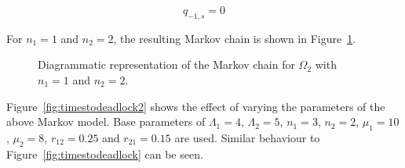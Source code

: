 \documentclass{article}
\numberwithin{equation}{section}
\begin{document}
\begin{equation}
  q_{-1, s} = 0
\end{equation}

For $n_1 = 1$ and $n_2 = 2$, the resulting Markov chain is shown in Figure~\ref{fig:2nodeMC}.

\begin{figure}[!htbp]
    \begin{center}
    
    \end{center}
    \caption{Diagrammatic representation of the Markov chain for $\Omega_2$ with $n_1=1$ and $n_2=2$.}
    \label{fig:2nodeMC}
\end{figure}

Figure~\ref{fig:timestodeadlock2} shows the effect of varying the parameters of the above Markov model.
Base parameters of $\Lambda_1 = 4$, $\Lambda_2 = 5$, $n_1 = 3$, $n_2 = 2$, $\mu_1 = 10$, $\mu_2 = 8$, $r_{12} = 0.25$ and $r_{21} = 0.15$ are used.
Similar behaviour to Figure~\ref{fig:timestodeadlock} can be seen.
\end{document}
